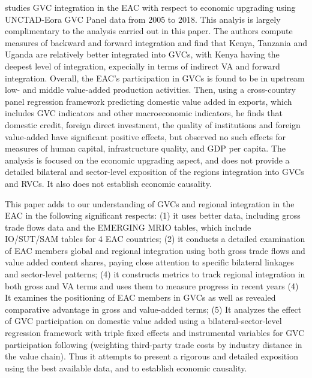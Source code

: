 \documentclass[a4paper]{article}
\begin{document}
\citet{lwesya2022integration} studies GVC integration in the EAC with respect to economic upgrading using UNCTAD-Eora GVC Panel data from 2005 to 2018. This analyis is largely complimentary to the analysis carried out in this paper. The authors compute measures of backward and forward integration and find that Kenya, Tanzania and Uganda are relatively
better integrated into GVCs, with Kenya having the deepest level of integration, expecially in terms of indirect VA and forward integration. Overall, the EAC's participation in GVCs is found to be in upstream low- and middle value-added production activities. Then, using a cross-country panel regression framework predicting domestic value added in exports, which includes GVC indicators and other macroeconomic indicators, he finds that domestic credit, foreign direct investment, the quality of institutions and foreign value-added have significant positive effects, but observed no such effects for measures of human capital, infrastructure quality, and GDP per capita. The analysis is focused on the economic upgrading aspect, and does not provide a detailed bilateral and sector-level exposition of the regions integration into GVCs and RVCs. It also does not establish economic causality. \newline

This paper adds to our understanding of GVCs and regional integration in the EAC in the following significant respects: (1) it uses better data, including gross trade flows data and the EMERGING MRIO tables, which include IO/SUT/SAM tables for 4 EAC countries; (2) it conducts a detailed examination of EAC members global and regional integration using both gross trade flows and value added content shares, paying close attention to specific bilateral linkages and sector-level patterns; (4) it constructs metrics to track regional integration in both gross and VA terms and uses them to measure progress in recent years (4) It examines the positioning of EAC members in GVCs as well as revealed comparative advantage in gross and value-added terms; (5) It analyzes the effect of GVC participation on domestic value added using a bilateral-sector-level regression framework with triple fixed effects and instrumental variables for GVC participation following \citep{Kummritz20161} (weighting third-party trade costs by industry distance in the value chain). Thus it attempts to present a rigorous and detailed exposition using the best available data, and to establish economic causality. 

\end{document}
